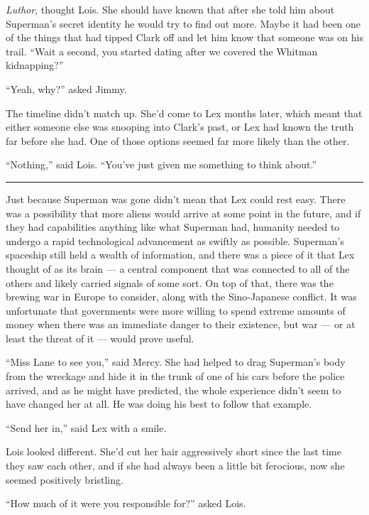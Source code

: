 \emph{Luthor}, thought Lois. She should have known that after she told
him about Superman's secret identity he would try to find out more.
Maybe it had been one of the things that had tipped Clark off and let
him know that someone was on his trail. ``Wait a second, you started
dating after we covered the Whitman kidnapping?''

``Yeah, why?'' asked Jimmy.

The timeline didn't match up. She'd come to Lex months later, which
meant that either someone else was snooping into Clark's past, or Lex
had known the truth far before she had. One of those options seemed far
more likely than the other.

``Nothing,'' said Lois. ``You've just given me something to think
about.''

\begin{center}\rule{0.5\linewidth}{0.5pt}\end{center}

Just because Superman was gone didn't mean that Lex could rest easy.
There was a possibility that more aliens would arrive at some point in
the future, and if they had capabilities anything like what Superman
had, humanity needed to undergo a rapid technological advancement as
swiftly as possible. Superman's spaceship still held a wealth of
information, and there was a piece of it that Lex thought of as its
brain --- a central component that was connected to all of the others
and likely carried signals of some sort. On top of that, there was the
brewing war in Europe to consider, along with the Sino‐Japanese
conflict. It was unfortunate that governments were more willing to spend
extreme amounts of money when there was an immediate danger to their
existence, but war --- or at least the threat of it --- would prove
useful.

``Miss Lane to see you,'' said Mercy. She had helped to drag Superman's
body from the wreckage and hide it in the trunk of one of his cars
before the police arrived, and as he might have predicted, the whole
experience didn't seem to have changed her at all. He was doing his best
to follow that example.

``Send her in,'' said Lex with a smile.

Lois looked different. She'd cut her hair aggressively short since the
last time they saw each other, and if she had always been a little bit
ferocious, now she seemed positively bristling.

``How much of it were you responsible for?'' asked Lois.

